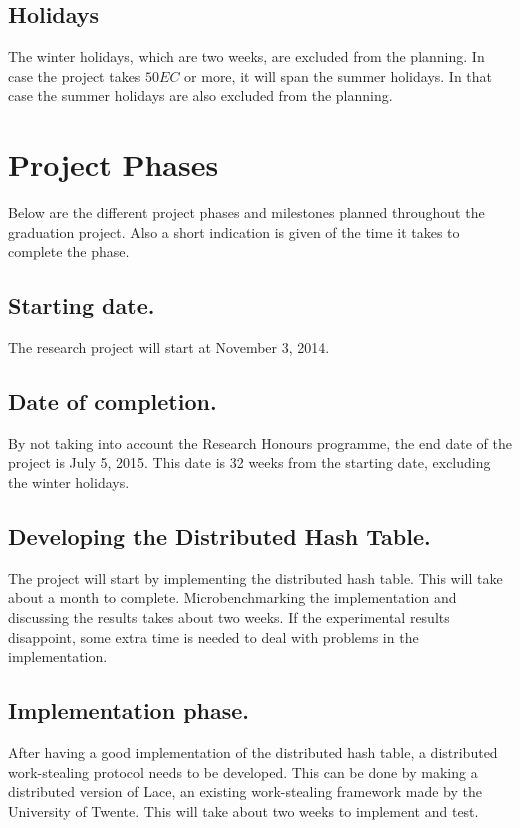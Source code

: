 \subsection{Holidays}
The winter holidays, which are two weeks, are excluded from the planning. In case the project takes $50EC$ or more, it will span the summer holidays. In that case the summer holidays are also excluded from the planning.

\section{Project Phases}
Below are the different project phases and milestones planned throughout the graduation project. Also a short indication is given of the time it takes to complete the phase.

\subsection{Starting date.}
The research project will start at November 3, 2014.

\subsection{Date of completion.}
By not taking into account the Research Honours programme, the end date of the project is July 5, 2015. This date is 32 weeks from the starting date, excluding the winter holidays.

\subsection{Developing the Distributed Hash Table.}
The project will start by implementing the distributed hash table. This will take about a month to complete. Microbenchmarking the implementation and discussing the results takes about two weeks. If the experimental results disappoint, some extra time is needed to deal with problems in the implementation.

\subsection{Implementation phase.}
After having a good implementation of the distributed hash table, a distributed work-stealing protocol needs to be developed. This can be done by making a distributed version of Lace, an existing work-stealing framework made by the University of Twente. This will take about two weeks to implement and test.

